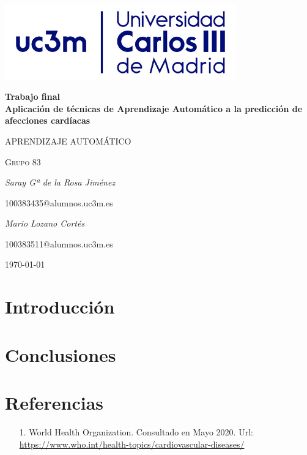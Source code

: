\documentclass[12pt,a4paper]{article}
\begin{document}
\setlength{\parindent}{0pt}
\begin{titlepage}
        \centering
        \includegraphics[width=0.75\textwidth]{img/logo_uc3m.jpg}\par\vspace{3cm}
        {\huge\bfseries Trabajo final \\ Aplicación de técnicas de Aprendizaje Automático a la predicción de afecciones cardíacas\par}
        \vspace{0.5cm}
        {\scshape\Large APRENDIZAJE AUTOMÁTICO\par}
        \vspace{1.5cm}
        {\scshape\Large Grupo 83\par}
        \vspace{1.5cm}
        {\Large\itshape Saray Gª de la Rosa Jiménez\par}
        {\Large 100383435@alumnos.uc3m.es\par}
        \vspace{1cm}
        {\Large\itshape Mario Lozano Cortés\par}
        {\Large 100383511@alumnos.uc3m.es\par}
        \vfill

        {\large \today\par}
\end{titlepage}

\tableofcontents

\newpage

\section{Introducción}
    
  \section{Conclusiones}

\clearpage 

\section{Referencias}
    \begin{itemize}
        \item [1.] World Health Organization. Consultado en Mayo 2020. Url: \\
        \href{https://www.who.int/health-topics/cardiovascular-diseases/\#tab=tab_1}{https://www.who.int/health-topics/cardiovascular-diseases/}
    \end{itemize}
\printindex
\end{document}
